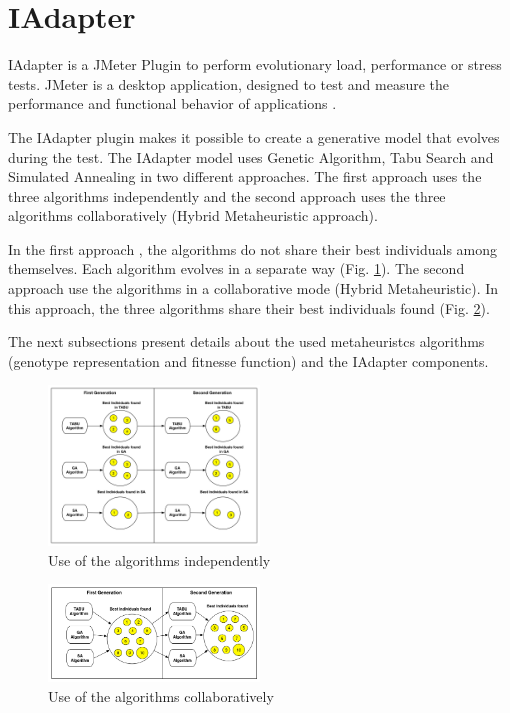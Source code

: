 \section{IAdapter}

IAdapter is a JMeter Plugin to perform evolutionary load, performance or stress tests. JMeter is a desktop application, designed to test and measure the performance and functional behavior of applications \cite{Nevedrov2007}.

The IAdapter plugin makes it possible to create a generative model that evolves during the test. The IAdapter model uses Genetic Algorithm, Tabu Search and Simulated Annealing in two different approaches.  The first approach uses the three algorithms independently and the second approach uses the three algorithms collaboratively (Hybrid Metaheuristic approach).

In the first approach , the algorithms do not share their best individuals among themselves. Each algorithm evolves in a separate way (Fig. \ref{fig:firstaproach}). The second approach use the algorithms in a collaborative mode (Hybrid Metaheuristic). In this approach, the three algorithms share their best individuals found (Fig. \ref{fig:secondapproach}).

The next subsections present details about the used metaheuristcs algorithms (genotype representation and fitnesse function) and the IAdapter components.

\begin{figure}[h]
\includegraphics[width=0.5\textwidth]{./images/independ.png}
\caption{Use of the algorithms independently}
\label{fig:firstaproach}
\end{figure}
\begin{figure}
\includegraphics[width=0.5\textwidth]{./images/collaborative.png}
\caption{Use of the  algorithms collaboratively}
\label{fig:secondapproach}
\end{figure}

